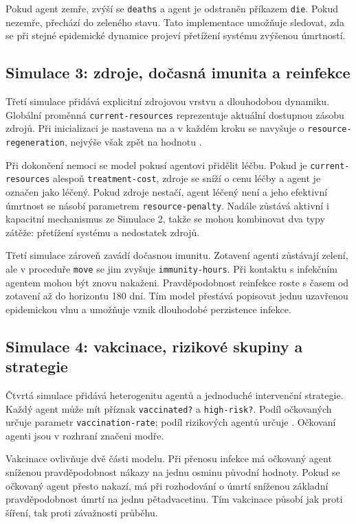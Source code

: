 \documentclass{article}
\begin{document}
Pokud agent zemře, zvýší se \texttt{deaths} a agent je odstraněn příkazem
\texttt{die}. Pokud nezemře, přechází do zeleného stavu. Tato implementace
umožňuje sledovat, zda se při stejné epidemické dynamice projeví přetížení
systému zvýšenou úmrtností.

\subsection{Simulace 3: zdroje, dočasná imunita a reinfekce}

Třetí simulace přidává explicitní zdrojovou vrstvu a dlouhodobou dynamiku.
Globální proměnná \texttt{current-resources} reprezentuje aktuální dostupnou
zásobu zdrojů. Při inicializaci je nastavena na  a v
každém kroku se navyšuje o \texttt{resource-regeneration}, nejvýše však zpět na
hodnotu .

Při dokončení nemoci se model pokusí agentovi přidělit léčbu. Pokud je
\texttt{current-resources} alespoň \texttt{treatment-cost}, zdroje se sníží
o cenu léčby a agent je označen jako léčený. Pokud zdroje nestačí, agent léčený
není a jeho efektivní úmrtnost se násobí parametrem
\texttt{resource-penalty}. Nadále zůstává aktivní i kapacitní mechanismus ze
Simulace 2, takže se mohou kombinovat dva typy zátěže: přetížení systému a
nedostatek zdrojů.

Třetí simulace zároveň zavádí dočasnou imunitu. Zotavení agenti zůstávají
zelení, ale v proceduře \texttt{move} se jim zvyšuje \texttt{immunity-hours}.
Při kontaktu s infekčním agentem mohou být znovu nakaženi. Pravděpodobnost
reinfekce roste s časem od zotavení až do horizontu 180 dní. Tím model přestává
popisovat jednu uzavřenou epidemickou vlnu a umožňuje vznik dlouhodobé
perzistence infekce.

\subsection{Simulace 4: vakcinace, rizikové skupiny a strategie}

Čtvrtá simulace přidává heterogenitu agentů a jednoduché intervenční strategie.
Každý agent může mít příznak \texttt{vaccinated?} a \texttt{high-risk?}. Podíl
očkovaných určuje parametr \texttt{vaccination-rate}; podíl rizikových agentů
určuje . Očkovaní agenti jsou v rozhraní značeni modře.

Vakcinace ovlivňuje dvě části modelu. Při přenosu infekce má očkovaný agent
sníženou pravděpodobnost nákazy na jednu osminu původní hodnoty. Pokud se
očkovaný agent přesto nakazí, má při rozhodování o úmrtí sníženou základní
pravděpodobnost úmrtí na jednu pětadvacetinu. Tím vakcinace působí jak proti
šíření, tak proti závažnosti průběhu.
\end{document}
